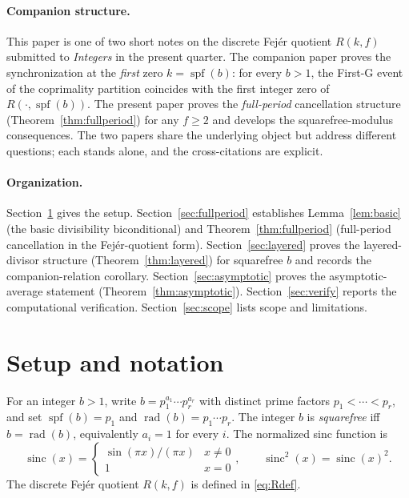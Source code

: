 \documentclass[11pt,reqno]{amsart}
\theoremstyle{plain}
\theoremstyle{definition}
\theoremstyle{remark}
\DeclareMathOperator{\sinc}{sinc}
\DeclareMathOperator{\spf}{spf}
\DeclareMathOperator{\rad}{rad}
\begin{document}
\paragraph{Companion structure.} This paper is one of two short notes
on the discrete Fej\'er quotient $R(k, f)$ submitted to \emph{Integers}
in the present quarter. The companion paper
\cite{SandersGish2026FirstG} proves the synchronization at the
\emph{first} zero $k = \spf(b)$: for every $b > 1$, the First-G event
of the coprimality partition coincides with the first integer zero of
$R(\cdot, \spf(b))$. The present paper proves the
\emph{full-period} cancellation structure (Theorem~\ref{thm:fullperiod})
for any $f \ge 2$ and develops the squarefree-modulus consequences. The
two papers share the underlying object but address different questions;
each stands alone, and the cross-citations are explicit.

\paragraph{Organization.} Section~\ref{sec:setup} gives the setup.
Section~\ref{sec:fullperiod} establishes Lemma~\ref{lem:basic} (the
basic divisibility biconditional) and Theorem~\ref{thm:fullperiod}
(full-period cancellation in the Fej\'er-quotient form).
Section~\ref{sec:layered} proves the layered-divisor structure
(Theorem~\ref{thm:layered}) for squarefree $b$ and records the
companion-relation corollary. Section~\ref{sec:asymptotic} proves
the asymptotic-average statement (Theorem~\ref{thm:asymptotic}).
Section~\ref{sec:verify} reports the computational verification.
Section~\ref{sec:scope} lists scope and limitations.

\section{Setup and notation}\label{sec:setup}

For an integer $b > 1$, write $b = p_{1}^{a_{1}} \cdots p_{r}^{a_{r}}$
with distinct prime factors $p_{1} < \cdots < p_{r}$, and set
$\spf(b) = p_{1}$ and $\rad(b) = p_{1} \cdots p_{r}$. The integer $b$
is \emph{squarefree} iff $b = \rad(b)$, equivalently $a_{i} = 1$ for
every $i$. The normalized sinc function is
\[
  \sinc(x) =
  \begin{cases}
    \sin(\pi x)/(\pi x) & x \ne 0 \\
    1 & x = 0
  \end{cases},
  \qquad
  \sinc^{2}(x) = \sinc(x)^{2}.
\]
The discrete Fej\'er quotient $R(k, f)$ is defined in
\eqref{eq:Rdef}.
\end{document}
